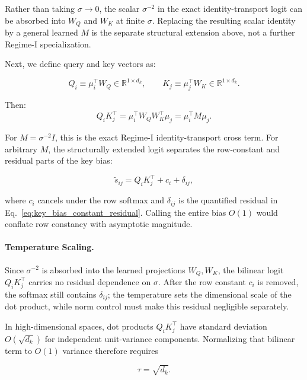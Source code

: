\documentclass[twoside,11pt]{article}
\begin{document}
Rather than taking $\sigma \to 0$, the scalar $\sigma^{-2}$ in the exact identity-transport logit can be absorbed into $W_Q$ and $W_K$ at finite $\sigma$. Replacing the resulting scalar identity by a general learned $M$ is the separate structural extension above, not a further Regime-I specialization.

Next, we define query and key vectors as:

\begin{equation}
Q_i \equiv \mu_i^\top W_Q \in \mathbb{R}^{1\times d_k}, \qquad K_j \equiv \mu_j^\top W_K \in \mathbb{R}^{1\times d_k}.
\end{equation}

Then:
\begin{equation}
Q_i K_j^\top = \mu_i^\top W_QW_K^\top\mu_j = \mu_i^\top M\mu_j.
\end{equation}

For $M = \sigma^{-2}I$, this is the exact Regime-I identity-transport cross term. For arbitrary $M$, the structurally extended logit separates the row-constant and residual parts of the key bias:

\begin{equation}
\tilde{s}_{ij} = Q_i K_j^\top + c_i + \delta_{ij},
\end{equation}

where $c_i$ cancels under the row softmax and $\delta_{ij}$ is the quantified residual in Eq.~\eqref{eq:key_bias_constant_residual}. Calling the entire bias $O(1)$ would conflate row constancy with asymptotic magnitude.

\paragraph{Temperature Scaling.}

Since $\sigma^{-2}$ is absorbed into the learned projections $W_Q, W_K$, the bilinear logit $Q_iK_j^\top$ carries no residual dependence on $\sigma$. After the row constant $c_i$ is removed, the softmax still contains $\delta_{ij}$; the temperature sets the dimensional scale of the dot product, while norm control must make this residual negligible separately.

In high-dimensional spaces, dot products $Q_iK_j^\top$ have standard deviation $O(\sqrt{d_k})$ for independent unit-variance components. Normalizing that bilinear term to $O(1)$ variance therefore requires

\begin{equation}
\tau = \sqrt{d_k}.
\end{equation}
\end{document}
